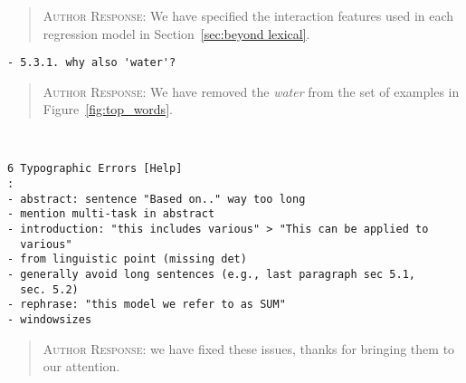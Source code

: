 \begin{quote}
\textsc{Author Response:}  We have specified the interaction features used in each regression model in Section~\ref{sec:beyond lexical}.
\end{quote}
\begin{verbatim}
- 5.3.1. why also 'water'?
\end{verbatim}  
\begin{quote}
\textsc{Author Response:}  We have removed the {\it water} from the set of examples in Figure~\ref{fig:top_words}.
\end{quote}
\begin{verbatim}


6 Typographic Errors [Help]
: 
- abstract: sentence "Based on.." way too long
- mention multi-task in abstract
- introduction: "this includes various" > "This can be applied to
  various"
- from linguistic point (missing det)
- generally avoid long sentences (e.g., last paragraph sec 5.1,
  sec. 5.2)
- rephrase: "this model we refer to as SUM"
- windowsizes
\end{verbatim}  
\begin{quote}
\textsc{Author Response:}  we have fixed these issues, thanks for bringing them to our attention.
\end{quote}
